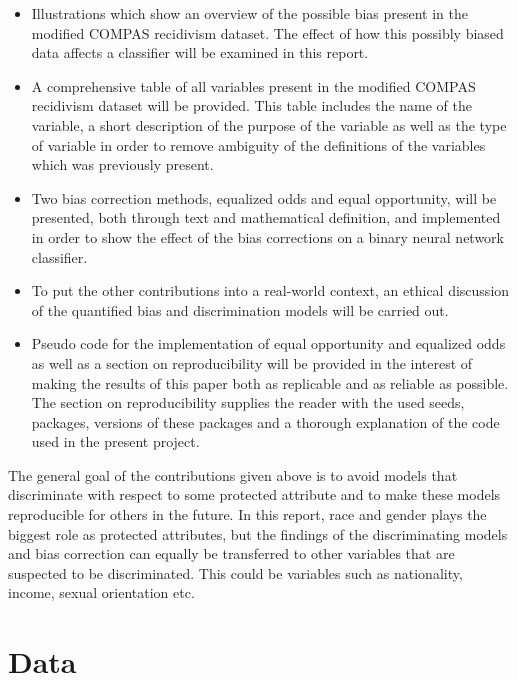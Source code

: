 \documentclass[11pt, fleqn, titlepage]{article}
\begin{document}
	\begin{itemize}
		\item Illustrations which show an overview of the possible bias present in the modified COMPAS recidivism dataset. The effect of how this possibly biased data affects a classifier will be examined in this report. 
		\item A comprehensive table of all variables present in the modified COMPAS recidivism dataset will be provided. This table includes the name of the variable, a short description of the purpose of the variable as well as the type of variable in order to remove ambiguity of the definitions of the variables which was previously present.
		\item Two bias correction methods, equalized odds and equal opportunity, will be presented, both through text and mathematical definition, and implemented in order to show the effect of the bias corrections on a binary neural network classifier.
		\item To put the other contributions into a real-world context, an ethical discussion of the quantified bias and discrimination models will be carried out.
		\item Pseudo code for the implementation of equal opportunity and equalized odds as well as a section on reproducibility will be provided in the interest of making the results of this paper both as replicable and as reliable as possible. The section on reproducibility supplies the reader with the used seeds, packages, versions of these packages and a thorough explanation of the code used in the present project.
	\end{itemize}
	The general goal of the contributions given above is to avoid models that discriminate with respect to some protected attribute and to make these models reproducible for others in the future. In this report, race and gender plays the biggest role as protected attributes, but the findings of the discriminating models and bias correction can equally be transferred to other variables that are suspected to be discriminated. This could be variables such as nationality, income, sexual orientation etc.
	
	\section{Data} \label{data}
	
\end{document}
